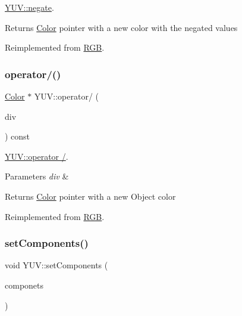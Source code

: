 \hyperlink{class_y_u_v_a079872ae88552066ce1abb39cc0a40de}{Y\+U\+V\+::negate}. 

\begin{DoxyReturn}{Returns}
\hyperlink{class_color}{Color} pointer with a new color with the negated values 
\end{DoxyReturn}


Reimplemented from \hyperlink{class_r_g_b_a7aad38ac17ec3201c65f8f5e90637b69}{R\+GB}.

\mbox{\label{class_y_u_v_a1b9300c00323eca16fc4bb028964e85f}} 
\subsubsection{\texorpdfstring{operator/()}{operator/()}}
{\footnotesize\ttfamily \hyperlink{class_color}{Color} $\ast$ Y\+U\+V\+::operator/ (\begin{DoxyParamCaption}\item[{const int \&}]{div }\end{DoxyParamCaption}) const\hspace{0.3cm}{\ttfamily [virtual]}}



\hyperlink{class_y_u_v_a1b9300c00323eca16fc4bb028964e85f}{Y\+U\+V\+::operator /}. 


\begin{DoxyParams}{Parameters}
{\em div} & \\
\hline
\end{DoxyParams}
\begin{DoxyReturn}{Returns}
\hyperlink{class_color}{Color} pointer with a new Object color 
\end{DoxyReturn}


Reimplemented from \hyperlink{class_r_g_b_a9d250e0f58e7ae7d4c69ced724da6f80}{R\+GB}.

\mbox{\label{class_y_u_v_a622daf7a688da4a227b63deb412c0d46}} 
\subsubsection{\texorpdfstring{set\+Components()}{setComponents()}}
{\footnotesize\ttfamily void Y\+U\+V\+::set\+Components (\begin{DoxyParamCaption}\item[{Q\+Vector$<$ double $>$}]{componets }\end{DoxyParamCaption})\hspace{0.3cm}{\ttfamily [virtual]}}



